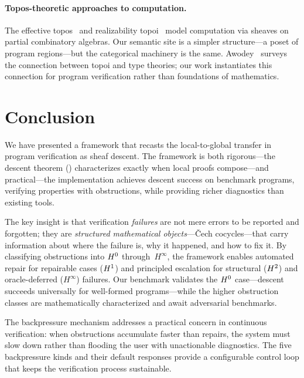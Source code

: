 \documentclass[11pt]{article}
\begin{document}
\paragraph{Topos-theoretic approaches to computation.}
The effective topos~\cite{hyland1982} and realizability
topoi~\cite{vanoosten2008} model computation via sheaves on partial
combinatory algebras.  Our semantic site is a simpler structure---a poset
of program regions---but the categorical machinery is the same.
Awodey~\cite{awodey2010} surveys the connection between topoi and type
theories; our work instantiates this connection for program verification
rather than foundations of mathematics.


\section{Conclusion}\label{sec:conclusion}

We have presented a framework that recasts the local-to-global transfer in
program verification as sheaf descent.  The framework is both rigorous---the
descent theorem () characterizes exactly when local
proofs compose---and practical---the \JuGeo{} implementation achieves
\compOverallAccuracy{} descent success on \compTotalPrograms{} benchmark
programs, verifying \compPropsSum{} properties with \compObstructionTotal{}
obstructions, while providing richer diagnostics than existing tools.

The key insight is that verification \emph{failures} are not mere errors
to be reported and forgotten; they are \emph{structured mathematical
objects}---\v{C}ech cocycles---that carry information about where the
failure is, why it happened, and how to fix it.  By classifying obstructions
into $H^{0}$ through~$H^{\infty}$, the framework enables automated
repair for repairable cases ($H^{1}$) and principled escalation for
structural ($H^{2}$) and oracle-deferred ($H^{\infty}$) failures.
Our benchmark validates the $H^{0}$ case---descent succeeds universally
for well-formed programs---while the higher obstruction classes are
mathematically characterized and await adversarial benchmarks.

The backpressure mechanism addresses a practical concern in continuous
verification: when obstructions accumulate faster than repairs, the system
must slow down rather than flooding the user with unactionable diagnostics.
The five backpressure kinds and their default responses provide a
configurable control loop that keeps the verification process sustainable.
\end{document}
